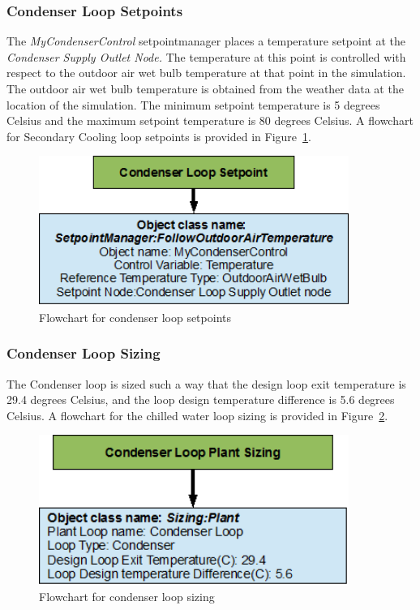 \subsubsection{Condenser Loop Setpoints}\label{condenser-loop-setpoints}

The \emph{MyCondenserControl} setpointmanager places a temperature setpoint at the \emph{Condenser Supply Outlet Node.} The temperature at this point is controlled with respect to the outdoor air wet bulb temperature at that point in the simulation. The outdoor air wet bulb temperature is obtained from the weather data at the location of the simulation. The minimum setpoint temperature is 5 degrees Celsius and the maximum setpoint temperature is 80 degrees Celsius. A flowchart for Secondary Cooling loop setpoints is provided in Figure~\ref{fig:flowchart-for-condenser-loop-setpoints}.

\begin{figure}[hbtp] %
\centering
\includegraphics[width=0.9\textwidth, height=0.9\textheight, keepaspectratio=true]{media/image072.png}
\caption{Flowchart for condenser loop setpoints \protect \label{fig:flowchart-for-condenser-loop-setpoints}}
\end{figure}

\subsubsection{Condenser Loop Sizing}\label{condenser-loop-sizing}

The Condenser loop is sized such a way that the design loop exit temperature is 29.4 degrees Celsius, and the loop design temperature difference is 5.6 degrees Celsius. A flowchart for the chilled water loop sizing is provided in Figure~\ref{fig:flowchart-for-condenser-loop-sizing}.

\begin{figure}[hbtp] %
\centering
\includegraphics[width=0.9\textwidth, height=0.9\textheight, keepaspectratio=true]{media/image073.png}
\caption{Flowchart for condenser loop sizing \protect \label{fig:flowchart-for-condenser-loop-sizing}}
\end{figure}
